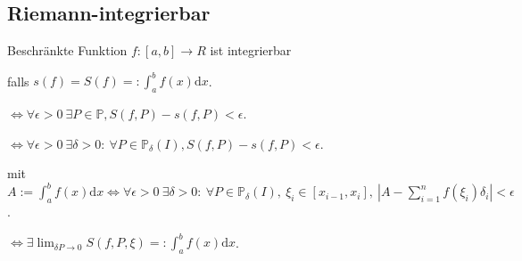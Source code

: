 \subsection{Riemann-integrierbar}
Beschränkte Funktion $f:[a,b] \to R$ ist integrierbar
\begin{compactitem}
    \item falls $s(f) = S(f) =: \int_{a}^{b} f(x) \mathrm{d}x$.
    \item $\iff \forall \epsilon > 0 \ \exists P \in \mathbb{P}, S(f, P) - s(f, P) < \epsilon$.
    \item $\iff \forall \epsilon > 0 \ \exists \delta > 0: \ \forall P \in \mathbb{P}_\delta(I), S(f, P) - s(f, P) < \epsilon$.
    \item mit $A:= \int_{a}^{b} f(x) \mathrm{d}x \iff \forall \epsilon > 0 \ \exists \delta > 0: \ \forall P \in \mathbb{P}_\delta(I), \ \xi_i \in [x_{i-1}, x_i], \ \left| A - \sum_{i=1}^{n} f(\xi_i) \delta_i \right| < \epsilon$.
    \item $\iff \exists \lim_{\delta{P} \to 0} S(f, P, \xi) =: \int_{a}^{b} f(x) \mathrm{d}x$.
\end{compactitem}

